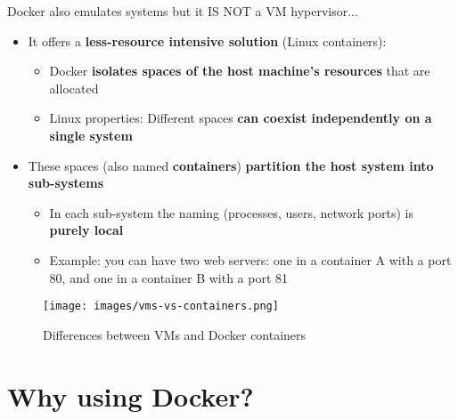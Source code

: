 \documentclass[handout]{beamer}[10pt, usepdftitle=false]
\begin{document}
	\begin{frame}
	
		
	
	Docker also emulates systems but it IS NOT a VM hypervisor...	
	\vspace*{0.6em}	
	
	\begin{itemize}
		\item{It offers a \textbf{less-resource intensive solution} (Linux containers):
			\begin{itemize}
				\item{Docker \textbf{isolates spaces of the host machine's resources} that are allocated}
				\item{Linux properties: Different spaces \textbf{can coexist independently on a single system}}
			\end{itemize}
		}
		\item{These spaces (also named \textbf{containers}) \textbf{partition the host system into sub-systems} 
			\begin{itemize}
				\item{In each sub-system the naming (processes, users, network ports) is \textbf{purely local}}
				\item{Example: you can have two web servers: one in a container A with a port 80, and one in a container B with a port 81}	
			\end{itemize}
				
		}
	\end{itemize}	 

	\end{frame}		
	
	\begin{frame}
	
	\begin{figure}
		\texttt{[image: images/vms-vs-containers.png]} 
     	\vspace*{-0.5em}
		\caption{Differences between VMs and Docker containers}
	\end{figure}	
	
	\end{frame}	
	
	\section{Why using Docker?}
	
\end{document}
